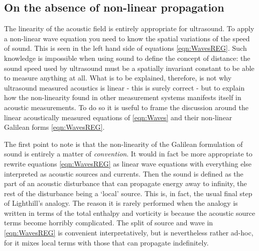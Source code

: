 \documentclass[10pt, fleqn,final,showtrims,oldfontcommands]{article} %
\newcommand{\secref}[1]{section~\ref{sec:#1}}
\newcommand{\eqnref}[1]{\ref{eqn:#1}}
\begin{document}


\subsection{On the absence of non-linear propagation} \label{sec:NonlinearProp}

The linearity of the acoustic field is entirely appropriate for ultrasound.
To apply a non-linear wave equation you need to know 
the spatial variations of the speed of sound. 
This is seen in the left hand side of equations \eqnref{WavesREG}.
Such knowledge is impossible
when using sound to define the concept of distance:
the sound speed used by ultrasound must be a spatially invariant constant to be able to measure anything at all.
What is to be explained, therefore, 
is not why ultrasound measured acoustics is linear - this is surely correct - 
but to explain how the non-linearity found in other measurement systems  manifests itself in acoustic measurements.
To do so it is useful to frame the discussion around the linear acoustically measured equations of
\eqnref{Waves}
and their non-linear Galilean forms \eqnref{WavesREG}.

The first point to note is that the non-linearity of the Galilean formulation of sound is entirely a matter of {\em  convention}.
It would in fact be more appropriate to rewrite equations \eqnref{WavesREG} as linear wave equations with everything else interpreted as acoustic sources and currents.
Then the sound is defined as the part of an acoustic disturbance that can propagate energy away to infinity,
the rest of the disturbance being a `local' source.
This is, in fact, the usual final step of Lighthill's analogy.
The reason it is rarely performed when the analogy is written in terms of the total enthalpy and vorticity is because
the acoustic source terms become horribly complicated.
The split of source and wave in \eqnref{WavesREG} is convenient  interpretatively, but is nevertheless rather ad-hoc,
for it mixes local terms with those that can propagate indefinitely.
\end{document}
